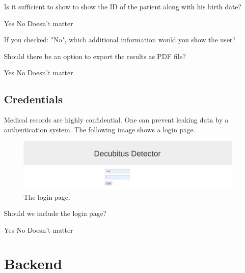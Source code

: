 \documentclass{exam}
\begin{document}
\begin{questions}
\question Is it sufficient to show to show the ID of the patient along with his birth date?

\begin{checkboxes}
	\choice Yes
	\choice No
	\choice Doesn't matter
\end{checkboxes}

If you checked: "No", which additional information would you show the user?
\vspace{5cm}

\question Should there be an option to export the results as PDF file?

\begin{checkboxes}
	\choice Yes
	\choice No
	\choice Doesn't matter
\end{checkboxes}

\end{questions}

\subsection*{Credentials}

Medical records are highly confidential. One can prevent leaking data by a authentication system. The following image shows a login page.

\begin{figure}[H]
	\centering
  \includegraphics[width=0.8\linewidth]{images/login.png}
	\captionsetup{labelformat=empty}
	\caption{The login page.}
  \label{fig:text}
\end{figure}

\begin{questions}
	\question Should we include the login page?

	\begin{checkboxes}
		\choice Yes
		\choice No
		\choice Doesn't matter
	\end{checkboxes}

\end{questions}

\section*{Backend}
\end{document}
